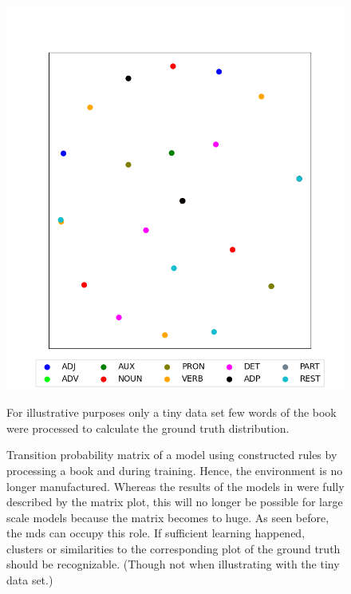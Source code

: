 \begin{figure}
{			\includegraphics[height=\twocolpicheight]{Bilder/chapter4/BspW2W/plots/OHE_OHE_500E_100BS_1L_1C_5P_30T_J/MDS_J_5pages_30T_words.png}
		}
	\caption{For illustrative purposes only a tiny data set \ie few words of the book were processed to calculate the ground truth distribution.}
	\label{fig: text model gt}
\end{figure}
%
\begin{figure}
	\centering
		\hfill
	\caption{Transition probability matrix of a model using constructed rules by processing a book and  during training. Hence, the environment is no longer manufactured. Whereas the results of the models in  were fully described by the matrix plot, this will no longer be possible for large scale models because the matrix becomes to huge. As seen before, the \gls{mds} can occupy this role. If sufficient learning happened, clusters or similarities to the corresponding plot of the ground truth should be recognizable. (Though not when illustrating with the tiny data set.)}
	\label{fig: text model sr}
\end{figure}

